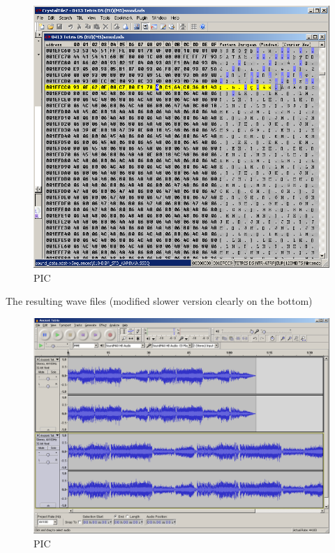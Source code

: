 \documentclass[
]{book}
\begin{document}
\begin{figure}
\centering
\includegraphics{images/159_home_fast6191_romhackingguide_unrenamed_fil___ders_romhackguideSDATSSEQedit_speedchange_2.png}
\caption{PIC}
\end{figure}

The resulting wave files (modified slower version clearly on the bottom)

\begin{figure}
\centering
\includegraphics{images/160_home_fast6191_romhackingguide_unrenamed_fil___ders_romhackguideSDATSSEQedit_speedchange_3.png}
\caption{PIC}
\end{figure}
\end{document}
